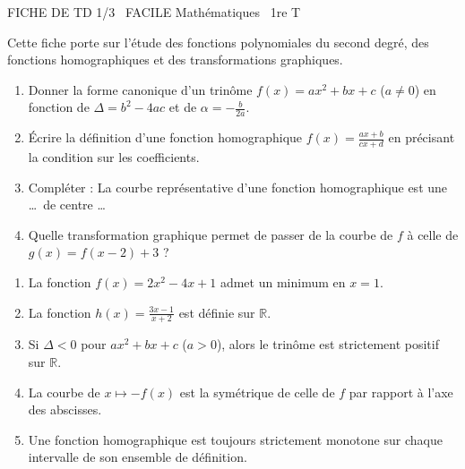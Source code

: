 \documentclass[11pt]{article}
\begin{document}
\begin{tcolorbox}[enhanced,colback=popink,colframe=popink,arc=10pt,boxrule=0pt,left=12pt,right=12pt,top=9pt,bottom=9pt]
{\color{white}\popxbold\small FICHE DE TD 1/3 \textbullet\ FACILE \hfill Mathématiques \textbullet\ 1re T\par}
\end{tcolorbox}
\vspace{4pt}
Cette fiche porte sur l'étude des fonctions polynomiales du second degré, des fonctions homographiques et des transformations graphiques.

\begin{exercice}
\begin{enumerate}
    \item Donner la forme canonique d'un trinôme $f(x)=ax^2+bx+c$ ($a \neq 0$) en fonction de $\Delta = b^2-4ac$ et de $\alpha = -\frac{b}{2a}$.
    \item Écrire la définition d'une fonction homographique $f(x)=\frac{ax+b}{cx+d}$ en précisant la condition sur les coefficients.
    \item Compléter : La courbe représentative d'une fonction homographique est une \ldots\ de centre \ldots
    \item Quelle transformation graphique permet de passer de la courbe de $f$ à celle de $g(x)=f(x-2)+3$ ?
\end{enumerate}
\end{exercice}

\begin{exercice}
\begin{enumerate}
    \item La fonction $f(x)=2x^2-4x+1$ admet un minimum en $x=1$.
    \item La fonction $h(x)=\frac{3x-1}{x+2}$ est définie sur $\mathbb{R}$.
    \item Si $\Delta < 0$ pour $ax^2+bx+c$ ($a>0$), alors le trinôme est strictement positif sur $\mathbb{R}$.
    \item La courbe de $x \mapsto -f(x)$ est la symétrique de celle de $f$ par rapport à l'axe des abscisses.
    \item Une fonction homographique est toujours strictement monotone sur chaque intervalle de son ensemble de définition.
\end{enumerate}
\end{exercice}
\end{document}
